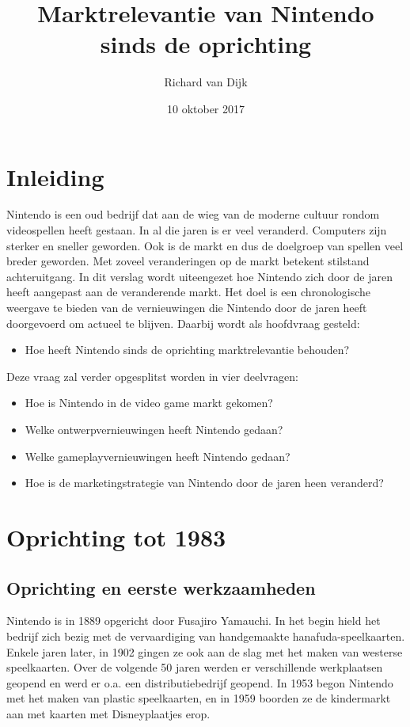 \documentclass{article}
\title{Marktrelevantie van Nintendo sinds de oprichting}
\date{10 oktober 2017}
\author{Richard van Dijk}
\begin{document}
\maketitle





\section{Inleiding}

Nintendo is een oud bedrijf dat aan de wieg van de moderne cultuur rondom videospellen heeft gestaan. In al die jaren is er veel veranderd. Computers zijn sterker en sneller geworden. Ook is de markt en dus de doelgroep van spellen veel breder geworden. Met zoveel veranderingen op de markt betekent stilstand achteruitgang. In dit verslag wordt uiteengezet hoe Nintendo zich door de jaren heeft aangepast aan de veranderende markt. Het doel is een chronologische weergave te bieden van de vernieuwingen die Nintendo door de jaren heeft doorgevoerd om actueel te blijven. Daarbij wordt als hoofdvraag gesteld:
\begin{itemize} \item Hoe heeft Nintendo sinds de oprichting marktrelevantie behouden? \end{itemize}
Deze vraag zal verder opgesplitst worden in vier deelvragen:
\begin{itemize}
\item Hoe is Nintendo in de video game markt gekomen?
\item Welke ontwerpvernieuwingen heeft Nintendo gedaan?
\item Welke gameplayvernieuwingen heeft Nintendo gedaan?
\item Hoe is de marketingstrategie van Nintendo door de jaren heen veranderd?
\end{itemize}

\section{Oprichting tot 1983}
\subsection{Oprichting en eerste werkzaamheden}
Nintendo is in 1889 opgericht door Fusajiro Yamauchi. In het begin hield het bedrijf zich bezig met de vervaardiging van handgemaakte hanafuda-speelkaarten. Enkele jaren later, in 1902 gingen ze ook aan de slag met het maken van westerse speelkaarten. Over de volgende 50 jaren werden er verschillende werkplaatsen geopend en werd er o.a. een distributiebedrijf geopend. In 1953 begon Nintendo met het maken van plastic speelkaarten, en in 1959 boorden ze de kindermarkt aan met kaarten met Disneyplaatjes erop. 
\end{document}
